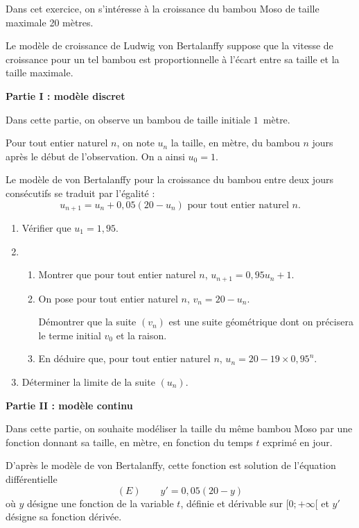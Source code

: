 Dans cet exercice, on s'intéresse à la croissance du bambou Moso de taille maximale 20 mètres. 

Le modèle de croissance de Ludwig von Bertalanffy suppose que la vitesse de croissance pour un tel bambou est proportionnelle à l'écart entre sa taille et la taille maximale.

\bigskip

\textbf{Partie I : modèle discret}

\medskip

Dans cette partie, on observe un bambou de taille initiale $1$~mètre.

Pour tout entier naturel $n$, on note $u_n$ la taille, en mètre, du bambou $n$ jours après le début de l'observation. On a ainsi $u_0 = 1$.

Le modèle de von Bertalanffy pour la croissance du bambou entre deux jours consécutifs se traduit par l'égalité : \[u_{n+1} = u_n + 0,05\left(20 - u_n\right) \text{ pour tout entier naturel } n.\]

\begin{enumerate}
	\item Vérifier que $u_1 = 1,95$.
	\item 
	\begin{enumerate}
		\item Montrer que pour tout entier naturel $n$, $u_{n+1} = 0,95u_n + 1$.
		\item On pose pour tout entier naturel $n$, $v_n = 20 - u_n$. 
		
		Démontrer que la suite $\left(v_n\right)$ est une suite géométrique dont on précisera le terme initial $v_0$ et la raison.
		\item En déduire que, pour tout entier naturel $n$, $u_n = 20 - 19 \times 0,95^n$.
	\end{enumerate}
	\item Déterminer la limite de la suite $\left(u_n\right)$.
\end{enumerate}

\textbf{Partie II : modèle continu}

\medskip

Dans cette partie, on souhaite modéliser la taille du même bambou Moso par une fonction donnant sa taille, en mètre, en fonction du temps $t$ exprimé en jour. 

D'après le modèle de von Bertalanffy, cette fonction est solution de l'équation différentielle \[(E) \qquad y' = 0,05(20 - y)\]%
où $y$ désigne une fonction de la variable $t$, définie et dérivable sur $[0;+\infty[$ et $y'$ désigne sa fonction dérivée.

